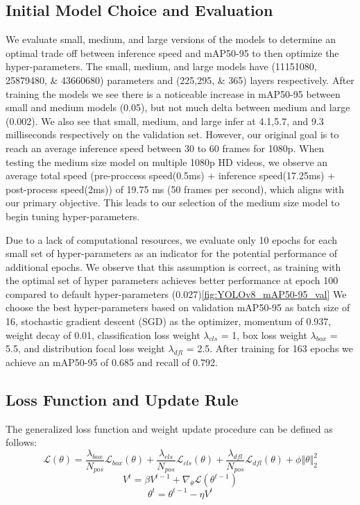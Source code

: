 \documentclass[10pt,twocolumn,letterpaper]{article}
\begin{document}
\subsection{Initial Model Choice and Evaluation}

We evaluate small, medium, and large versions of the models to determine an optimal trade off between inference speed and mAP50-95 to then optimize the hyper-parameters. The small, medium, and large models have (11151080, 25879480, \& 43660680) parameters and (225,295, \& 365) layers respectively. After training the models we see there is a noticeable increase in mAP50-95 between small and medium models (0.05), but not much delta between medium and large (0.002). We also see that small, medium, and large infer at 4.1,5.7, and 9.3 milliseconds respectively on the validation set. However, our original goal is to reach an average inference speed between 30 to 60 frames for 1080p. When testing the medium size model on multiple 1080p HD videos, we observe an average total speed (pre-proccess speed(0.5ms) + inference speed(17.25ms) + post-process speed(2ms)) of 19.75 ms (50 frames per second), which aligns with our primary objective. This leads to our selection of the medium size model to begin tuning hyper-parameters.

Due to a lack of computational resources, we evaluate only 10 epochs for each small set of hyper-parameters as an indicator for the potential performance of additional epochs. We observe that this assumption is correct, as training with the optimal set of hyper parameters achieves better performance at epoch 100 compared to default hyper-parameters (0.027)\ref{fig:YOLOv8_mAP50-95_val} We choose the best hyper-parameters based on validation mAP50-95 as batch size of 16, stochastic gradient descent (SGD) as the optimizer, momentum of 0.937, weight decay of 0.01, classification loss weight $\lambda_{cls}$ = 1, box loss weight $\lambda_{box}$ = 5.5, and distribution focal loss weight $\lambda_{dfl}$ = 2.5. After training for 163 epochs we achieve an mAP50-95 of 0.685 and recall of 0.792.

\subsection{Loss Function and Update Rule}
The generalized loss function and weight update procedure can be defined as follows: 
\begin{equation}\label{Generalized Loss}
\mathcal{L}(\theta) = \dfrac{\lambda_{box}}{N_{pos}}\mathcal{L}_{box}(\theta) + \dfrac{\lambda_{cls}}{N_{pos}}\mathcal{L}_{cls}(\theta) + \dfrac{\lambda_{dfl}}{N_{pos}}\mathcal{L}_{dfl}(\theta) + \phi\Vert \theta \Vert_2^2
\end{equation}    
\begin{equation}\label{Velocity}
V^t = \beta V^{t-1} + \nabla_{\theta}\mathcal{L}(\theta^{t-1})
\end{equation}    
\begin{equation}\label{Weight Update}
\theta^{t} = \theta^{t-1} - \eta V^{t}
\end{equation}
\end{document}
